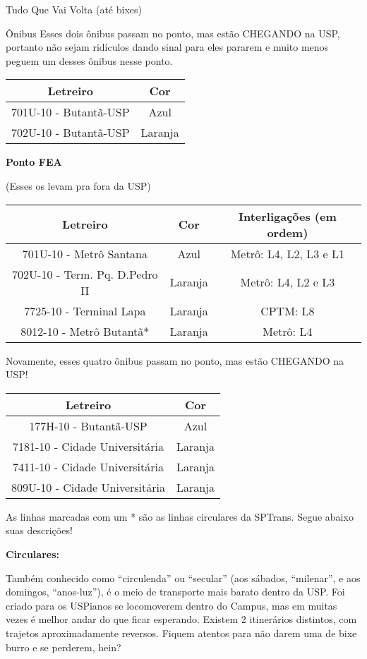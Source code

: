 \begin{secao}{Tudo Que Vai Volta (até bixes)}
\begin{subsecao}{Ônibus}
Esses dois ônibus passam no ponto, mas estão CHEGANDO na USP, portanto não sejam
ridículos dando sinal para eles pararem e muito menos peguem um desses ônibus
nesse ponto.

\begin{center}
	\begin{tabular}{|c|c|}
	  \hline
	  Letreiro & Cor\\
	  \hline
	  701U-10 - Butantã-USP & Azul\\
	  702U-10 - Butantã-USP & Laranja\\
	  \hline
	\end{tabular}
\end{center}

{\bf Ponto FEA}

(Esses os levam pra fora da USP)
\begin{center}
	\begin{tabular}{|c|c|c|}
      \hline
	  Letreiro & Cor & Interligações (em ordem)\\
	  \hline
	  701U-10 - Metrô Santana & Azul & Metrô: L4, L2, L3 e L1\\
	  702U-10 - Term. Pq. D.Pedro II & Laranja & Metrô: L4, L2 e L3\\
	  7725-10 - Terminal Lapa & Laranja & CPTM: L8\\
	  8012-10 - Metrô Butantã* & Laranja & Metrô: L4\\
      \hline
	\end{tabular}
\end{center}

Novamente, esses quatro ônibus passam no ponto, mas estão CHEGANDO na USP!
\begin{center}
	\begin{tabular}{|c|c|}
	  \hline
	  Letreiro & Cor\\
	  \hline
	  177H-10 - Butantã-USP & Azul\\
	  7181-10 - Cidade Universitária & Laranja\\
	  7411-10 - Cidade Universitária & Laranja\\
	  809U-10 - Cidade Universitária & Laranja\\
	  \hline
	\end{tabular}
\end{center}

As linhas marcadas com um * são as linhas circulares da SPTrans. Segue abaixo suas descrições!

{\bf Circulares:}

Também conhecido como ``circulenda'' ou ``secular'' (aos sábados, ``milenar'',
e aos domingos, ``anos-luz''), é o meio de transporte mais barato dentro da USP.
Foi criado para os USPianos se locomoverem dentro do Campus, mas em muitas vezes
é melhor andar do que ficar esperando. Existem 2 itinerários distintos, com
trajetos aproximadamente reversos. Fiquem atentos para não darem uma de bixe
burro e se perderem, hein?


\end{subsecao}
\end{secao}
